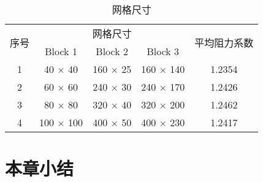 \begin{table}
	\caption{网格尺寸}\label{tab: grid}
	\vspace{.5em}\centering\wuhao
	\begin{tabular}{ccccc}
		\toprule[1.5pt]
		\multirow{2}[3]{*}{序号} & \multicolumn{3}{c}{网格尺寸} & \multirow{2}[3]{*}{平均阻力系数} \\
		\cmidrule[.67pt](lr){2-4}
		& Block 1 & Block 2 & Block 3 & \\
		\midrule[1pt]
		1 & 40 $\times$ 40 & 160 $\times$ 25 & 160 $\times$ 140 & 1.2354 \\
		2 & 60 $\times$ 60 & 240 $\times$ 30 & 240 $\times$ 170 & 1.2426 \\
		3 & 80 $\times$ 80 & 320 $\times$ 40 & 320 $\times$ 200 & 1.2462 \\
		4 & 100 $\times$ 100 & 400 $\times$ 50 & 400 $\times$ 230 & 1.2417 \\
		\bottomrule[1.5pt]
	\end{tabular}
\end{table}

\section{本章小结}
